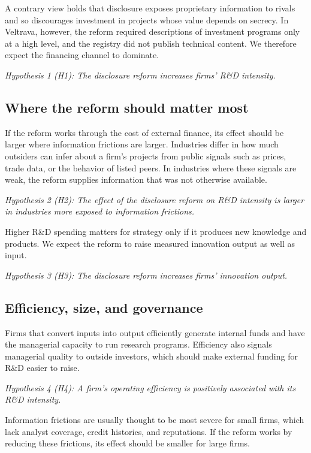 \documentclass[12pt]{article}
\begin{document}
A contrary view holds that disclosure exposes proprietary information to rivals and so discourages investment in projects whose value depends on secrecy. In Veltrava, however, the reform required descriptions of investment programs only at a high level, and the registry did not publish technical content. We therefore expect the financing channel to dominate.

\textit{Hypothesis 1 (H1): The disclosure reform increases firms' R\&D intensity.}

\subsection{Where the reform should matter most}

If the reform works through the cost of external finance, its effect should be larger where information frictions are larger. Industries differ in how much outsiders can infer about a firm's projects from public signals such as prices, trade data, or the behavior of listed peers. In industries where these signals are weak, the reform supplies information that was not otherwise available.

\textit{Hypothesis 2 (H2): The effect of the disclosure reform on R\&D intensity is larger in industries more exposed to information frictions.}

Higher R\&D spending matters for strategy only if it produces new knowledge and products. We expect the reform to raise measured innovation output as well as input.

\textit{Hypothesis 3 (H3): The disclosure reform increases firms' innovation output.}

\subsection{Efficiency, size, and governance}

Firms that convert inputs into output efficiently generate internal funds and have the managerial capacity to run research programs. Efficiency also signals managerial quality to outside investors, which should make external funding for R\&D easier to raise.

\textit{Hypothesis 4 (H4): A firm's operating efficiency is positively associated with its R\&D intensity.}

Information frictions are usually thought to be most severe for small firms, which lack analyst coverage, credit histories, and reputations. If the reform works by reducing these frictions, its effect should be smaller for large firms.
\end{document}
